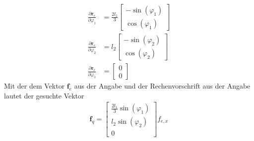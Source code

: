 \begin{align*}
	\frac{\partial \textbf{r}_e}{\partial \varphi_1} &= \frac{2l_1}{3}\begin{bmatrix}
		-\sin(\varphi_1) \\
		\cos(\varphi_1)
	\end{bmatrix} \\
		\frac{\partial \textbf{r}_e}{\partial \varphi_2} &= l_2\begin{bmatrix}
			-\sin(\varphi_2) \\
			\cos(\varphi_2)
	\end{bmatrix} \\
	\frac{\partial \textbf{r}_e}{\partial \varphi_1} &= \begin{bmatrix}
		0 \\
		0
	\end{bmatrix}
\end{align*}
Mit der dem Vektor $\textbf{f}_e$ aus der Angabe und der Rechenvorschrift aus der Angabe lautet der gesuchte Vektor
\begin{align*}
	\textbf{f}_q = \begin{bmatrix}
		\frac{2l_1}{3}\sin(\varphi_1) \\
		l_2 \sin(\varphi_2) \\
		0
	\end{bmatrix}
	f_{e,x}
\end{align*}